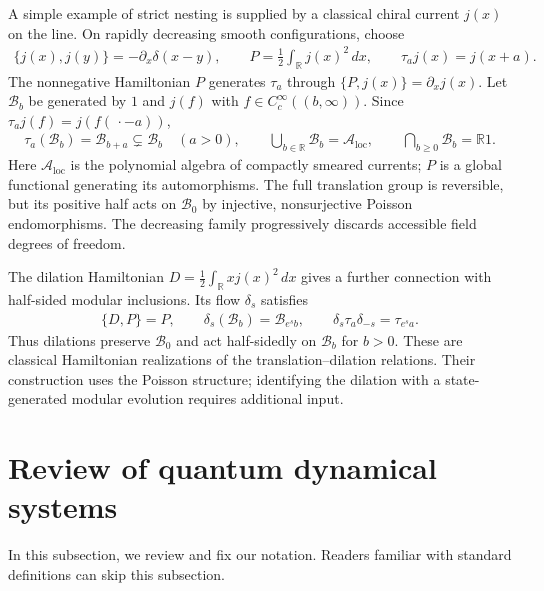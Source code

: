 \documentclass[a4paper,11pt]{article}
\theoremstyle{definition}
\theoremstyle{remark}
\begin{document}
A simple example of strict nesting is supplied by a classical chiral current $j(x)$
on the line.  On rapidly decreasing smooth configurations, choose
\begin{align}
    \{j(x),j(y)\}=-\partial_x\delta(x-y),\qquad
    P=\frac{1}{2}\int_{\mathbb{R}}j(x)^2\,dx,\qquad
    \tau_a j(x)=j(x+a).
\end{align}
The nonnegative Hamiltonian $P$ generates $\tau_a$ through $\{P,j(x)\}=\partial_xj(x)$.
Let $\mathcal{B}_b$ be generated by $1$ and $j(f)$ with $f\in C_c^\infty((b,\infty))$.
Since $\tau_a j(f)=j(f(\,\cdot-a))$,
\begin{align}
    \tau_a(\mathcal{B}_b)=\mathcal{B}_{b+a}\subsetneq\mathcal{B}_b\quad(a>0),\qquad
    \bigcup_{b\in\mathbb{R}}\mathcal{B}_b=\mathcal{A}_{\mathrm{loc}},\qquad
    \bigcap_{b\geq0}\mathcal{B}_b=\mathbb{R}1.
\end{align}
Here $\mathcal{A}_{\mathrm{loc}}$ is the polynomial algebra of compactly smeared
currents; $P$ is a global functional generating its automorphisms.  The full
translation group is reversible, but its positive half acts on $\mathcal{B}_0$ by
injective, nonsurjective Poisson endomorphisms.  The decreasing family progressively
discards accessible field degrees of freedom.
 
The dilation Hamiltonian $D=\frac{1}{2}\int_{\mathbb{R}}xj(x)^2\,dx$ gives a further
connection with half-sided modular inclusions.  Its flow $\delta_s$ satisfies
\begin{align}
    \{D,P\}=P,\qquad
    \delta_s(\mathcal{B}_b)=\mathcal{B}_{e^s b},\qquad
    \delta_s\tau_a\delta_{-s}=\tau_{e^s a}.
\end{align}
Thus dilations preserve $\mathcal{B}_0$ and act half-sidedly on $\mathcal{B}_b$ for
$b>0$.  These are classical Hamiltonian realizations of the translation--dilation
relations.  Their construction uses the Poisson structure; identifying the dilation
with a state-generated modular evolution requires additional input.

\section{Review of quantum dynamical systems}
\label{subsec:review-quantum}
 
In this subsection, we review and fix our notation.  Readers familiar with standard
definitions can skip this subsection.
 
\end{document}
